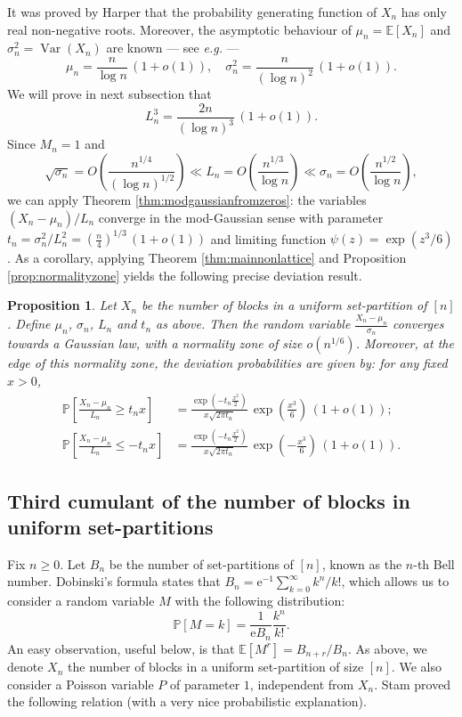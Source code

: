 \documentclass[12pt,a4paper,reqno]{amsart}
\newtheorem{proposition}[lemma]{Proposition}
\theoremstyle{remark}
\newcommand{\E}{\mathrm{e}}
\newcommand{\esper}{\mathbb{E}}
\newcommand{\proba}{\mathbb{P}}
\DeclareMathOperator\Var{Var}
\begin{document}
It was proved by Harper \cite[Lemma 1]{HarperCLTBlocks} that the probability generating function of $X_n$ has only real non-negative roots. Moreover, the asymptotic behaviour of $\mu_n=\esper[X_n]$ and $\sigma_n^2=\Var(X_n)$ are known  --- see {\it e.g.} \cite[Theorem 2.1]{DiaconisEtAlCLTSetPartitions} ---
\[ \mu_n = \frac{n}{\log n}\, (1+o(1)), \quad \sigma_n^2=\frac{n}{(\log n)^2}\,(1+o(1)).\]
We will prove in next subsection that
\[ L_n^3= \frac{2n}{(\log n)^3}\,(1+o(1)). \]
Since $M_n=1$ and
$$\sqrt{\sigma_n} = O\!\left(\frac{n^{1/4}}{(\log n)^{1/2}}\right) \ll L_n = O\!\left(\frac{n^{1/3}}{\log n}\right) \ll \sigma_n =  O\!\left(\frac{n^{1/2}}{\log n}\right),$$ 
we can apply Theorem \ref{thm:modgaussianfromzeros}: the variables $(X_n-\mu_n)/L_n$ converge in the mod-Gaussian sense with parameter $t_n=\sigma_n^2/L_n^2=(\frac{n}{4})^{1/3}\,(1+o(1))$ and limiting function $\psi(z)=\exp(z^3/6)$.
As a corollary, applying Theorem \ref{thm:mainnonlattice} and Proposition \ref{prop:normalityzone} yields the following precise deviation result.
\begin{proposition}
Let $X_n$ be the number of blocks in a uniform set-partition of $[n]$. Define $\mu_n$, $\sigma_n$, $L_n$ and $t_n$ as above. Then the random variable $\frac{X_n - \mu_n}{\sigma_n}$ converges towards a Gaussian law, with a normality zone of size $o(n^{1/6})$. Moreover, at the edge of this normality zone,
the deviation probabilities are given by: for any fixed $x>0$, 
\begin{align*}
\proba\!\left[\frac{X_n-\mu_n}{L_n} \ge t_n x\right] &= \frac{\exp(-t_n \frac{x^2}{2})}{x\sqrt{2\pi t_n}} \,\exp\left(\frac{x^3}{6}\right)\, (1+o(1)); \\
\proba\!\left[\frac{X_n-\mu_n}{L_n} \le -t_n x\right] &= \frac{\exp(-t_n \frac{x^2}{2})}{x\sqrt{2\pi t_n}} \,\exp\left(-\frac{x^3}{6}\right)\, (1+o(1)). 
\end{align*}
\end{proposition}
\bigskip



\subsection{Third cumulant of the number of blocks in uniform set-partitions}
Fix $n \ge 0$. Let $B_n$ be the number of set-partitions of $[n]$, known as the $n$-th Bell number. Dobinski's formula states that $B_n=\E^{-1} \sum_{k =0}^\infty k^n/k!$, which allows us to consider a random variable $M$ with the following distribution:
\[\proba[M=k] = \frac{1}{\E B_n} \frac{k^n}{k!}.\]
An easy observation, useful below, is that $\esper[M^r]=B_{n+r}/B_n$. As above, we denote $X_n$ the number of blocks in a uniform set-partition of size $[n]$. We also consider a Poisson variable $P$ of parameter $1$, independent from $X_n$.
Stam \cite{StamRandomPartition} proved the following relation (with a very nice probabilistic explanation).
\end{document}
